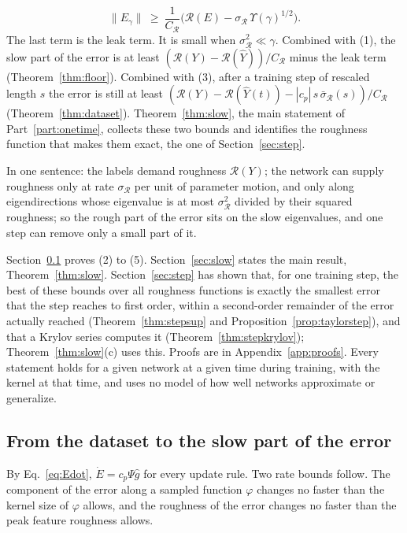 \documentclass[11pt]{article}
\theoremstyle{definition}
\theoremstyle{remark}
\newcommand{\Rgh}{\mathcal{R}}           %
\newcommand{\sR}{\sigma_{\Rgh}}
\newcommand{\CR}{C_{\Rgh}}
\begin{document}
\begin{enumerate}[label=(\arabic*)]
\begin{equation}\label{eq:roughslow-intro}
\|E_\gamma\| \ \ge\ \frac{1}{\CR}\Big(\Rgh(E) - \sR\,\Upsilon(\gamma)^{1/2}\Big).
\end{equation}
The last term is the leak term.
It is small when $\sR^2 \ll \gamma$.
Combined with (1), the slow part of the error is at least $(\Rgh(Y) - \Rgh(\hat Y))/\CR$ minus the leak term (Theorem~\ref{thm:floor}).
Combined with (3), after a training step of rescaled length $s$ the error is still at least $(\Rgh(Y) - \Rgh(\hat Y(t)) - |c_p|\,s\,\bar\sigma_\Rgh(s))/\CR$ (Theorem~\ref{thm:dataset}).
Theorem~\ref{thm:slow}, the main statement of Part~\ref{part:onetime}, collects these two bounds and identifies the roughness function that makes them exact, the one of Section~\ref{sec:step}.
\end{enumerate}
In one sentence: the labels demand roughness $\Rgh(Y)$; the network can supply roughness only at rate $\sR$ per unit of parameter motion, and only along eigendirections whose eigenvalue is at most $\sR^2$ divided by their squared roughness; so the rough part of the error sits on the slow eigenvalues, and one step can remove only a small part of it.

Section~\ref{sec:rates} proves (2) to (5).
Section~\ref{sec:slow} states the main result, Theorem~\ref{thm:slow}.
Section~\ref{sec:step} has shown that, for one training step, the best of these bounds over all roughness functions is exactly the smallest error that the step reaches to first order, within a second-order remainder of the error actually reached (Theorem~\ref{thm:stepsup} and Proposition~\ref{prop:taylorstep}), and that a Krylov series computes it (Theorem~\ref{thm:stepkrylov}); Theorem~\ref{thm:slow}(c) uses this.
Proofs are in Appendix~\ref{app:proofs}.
Every statement holds for a given network at a given time during training, with the kernel at that time, and uses no model of how well networks approximate or generalize.

\subsection{From the dataset to the slow part of the error}\label{sec:rates}\label{sec:smooth}\label{sec:floor}

By Eq.~\eqref{eq:Edot}, $\dot E = c_p\Psi\hat g$ for every update rule.
Two rate bounds follow.
The component of the error along a sampled function $\varphi$ changes no faster than the kernel size of $\varphi$ allows, and the roughness of the error changes no faster than the peak feature roughness allows.
\end{document}
